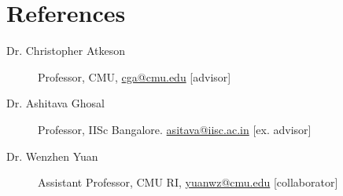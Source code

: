 \documentclass[letterpaper,11pt]{article}
\begin{document}



\section{References}
\begin{description}
  \item[Dr. Christopher Atkeson] Professor, CMU, \href{mailto:cga@cmu.edu}{cga@cmu.edu} [advisor]
  \vspace{-0.1 in}
  \item[Dr. Ashitava Ghosal] Professor, IISc Bangalore.  \href{mailto:asitava@iisc.ac.in}{asitava@iisc.ac.in} [ex. advisor]
  \vspace{-0.1 in}
  \item[Dr. Wenzhen Yuan] Assistant Professor, CMU RI, \href{mailto:yuanwz@cmu.edu}{yuanwz@cmu.edu} [collaborator]
  \end{description}
  
\end{document}
